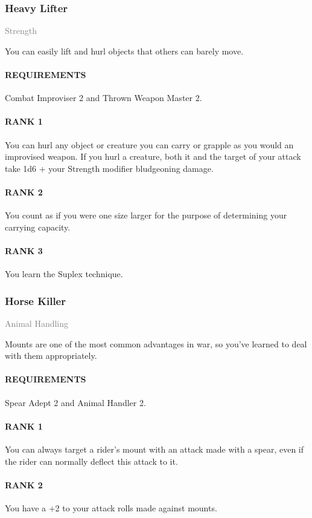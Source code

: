 \subsubsection{Heavy Lifter} \label{feat::heavylifter}
\small{\textcolor{gray}{Strength}}

\normalsize
You can easily lift and hurl objects that others can barely move.
\paragraph{REQUIREMENTS} Combat Improviser 2 and Thrown Weapon Master 2.
\paragraph{RANK 1} You can hurl any object or creature you can carry or grapple as you would an improvised weapon.
If you hurl a creature, both it and the target of your attack take 1d6 + your Strength modifier bludgeoning damage.
\paragraph{RANK 2} You count as if you were one size larger for the purpose of determining your carrying capacity.
\paragraph{RANK 3} You learn the Suplex technique.

\subsubsection{Horse Killer} \label{feat::horsekiller}
\small{\textcolor{gray}{Animal Handling}}

\normalsize
Mounts are one of the most common advantages in war, so you've learned to deal with them appropriately.
\paragraph{REQUIREMENTS} Spear Adept 2 and Animal Handler 2.
\paragraph{RANK 1} You can always target a rider's mount with an attack made with a spear, even if the rider can normally deflect this attack to it.
\paragraph{RANK 2} You have a +2 to your attack rolls made against mounts.
